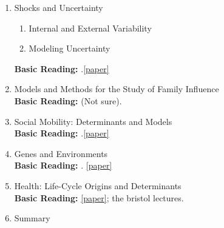 \documentclass[12pt]{article}
\begin{document}
\begin{enumerate}
\item Shocks and Uncertainty
\begin{enumerate}
\item Internal and External Variability
\item Modeling Uncertainty
\end{enumerate}
\textbf{Basic Reading:} \citet{meghir2011earnings}.\href{http://ac.els-cdn.com/S0169721811024075/1-s2.0-S0169721811024075-main.pdf?_tid=a5ee17b2-71af-11e3-8714-00000aacb361&acdnat=1388448677_05c5c0cfe2a9b4f16dc0c8b50e77b472}{[paper]}
\item Models and Methods for the Study of Family Influence\\
\textbf{Basic Reading:} \citet{Bjorklund2011education} (Not sure).
\item Social Mobility: Determinants and Models\\
\textbf{Basic Reading:} \citet{black2011recent}.\href{http://ac.els-cdn.com/S0169721811024142/1-s2.0-S0169721811024142-main.pdf?_tid=63166836-71af-11e3-867a-00000aab0f6c&acdnat=1388448564_1db21dc1a789392af74b28c1a8091573}{[paper]}
\item Genes and Environments\\
\textbf{Basic Reading:} \citet{kohler2011social}. \href{http://www.tandfonline.com/doi/pdf/10.1080/19485565.2011.580619}{[paper]}
\item Health: Life-Cycle Origins and Determinants\\
\textbf{Basic Reading:} \citet{currie2011human} \href{http://ac.els-cdn.com/S0169721811024130/1-s2.0-S0169721811024130-main.pdf?_tid=d912d070-71ae-11e3-bfe5-00000aab0f01&acdnat=1388448333_62aba9d0e9c94fc8b2e42e967c656aff}{[paper]}; the bristol lectures.
\item Summary
\end{enumerate}



\end{document}

